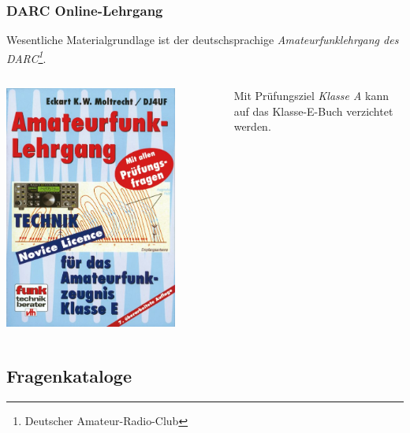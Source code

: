 \begin{frame}
    \frametitle{DARC Online-Lehrgang}

    Wesentliche Materialgrundlage ist der deutschsprachige
    \emph{Amateurfunklehrgang\hyperlink{refs}{\cite{darc}} des
    DARC\footnote{Deutscher Amateur-Radio-Club}}.

    \begin{columns}[c]
        \column[c]{5cm}
        \begin{center}
            \includegraphics[width=0.8\textwidth]{e00/Amateurfunklehrgang-Technik-fuer-das-Amateurfunkzeugnis-Klasse-E.jpg}
            \tiny \hyperlink{refs}{\cite{darcv}}
        \end{center}
        \column{5cm}
            Mit Prüfungsziel \emph{Klasse A} kann auf das Klasse-E-Buch
            verzichtet werden.
    \end{columns}

\end{frame}

\subsection{Fragenkataloge}

